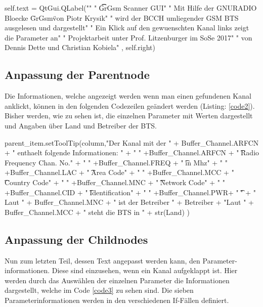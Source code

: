\begin{code}[firstnumber=100,numbers=left,stepnumber=1, caption={Titelseite},captionpos=b,label={code1}]
self.text = QtGui.QLabel("\n"
                         " \t\t   GrGsm Scanner GUI\n\n\n"
                         " Mit Hilfe der GNURADIO Bloecke \"GrGsm\" von Piotr Krysik\n"
                         " wird der BCCH umliegender GSM BTS ausgelesen und dargestellt\n\n"
                         " Ein Klick auf den gewuenschten Kanal links zeigt die Parameter an\n\n\n\n\n\n\n\n\n\n\n"
                         " Projektarbeit unter Prof. Litzenburger im SoSe 2017\n"
                         " von Dennis Dette und Christian Kobiela\n\n"
                         , self.right)
\end{code} 
\noindent 

\subsection*{Anpassung der Parentnode}

Die Informationen, welche angezeigt werden wenn man einen gefundenen Kanal anklickt, können in den folgenden Codezeilen geändert werden (Listing: \ref{code2}). Bisher werden, wie zu sehen ist, die einzelnen Parameter mit Werten dargestellt und Angaben über Land und Betreiber der BTS. 

\begin{code}[firstnumber=187,numbers=left,stepnumber=1, caption={Kanalinformation},captionpos=b,label={code2}]
parent_item.setToolTip(column,"Der Kanal mit der " + Buffer_Channel.ARFCN + 
		" enthaelt folgende Informationen: \n\n"
		+ " " +Buffer_Channel.ARFCN + " \t\tAbsolute Radio Frequency Chan. No.\n"
		+ " " +Buffer_Channel.FREQ + " \t\tFrequency in Mhz\n"
		+ " " +Buffer_Channel.LAC + " \t\tLocation Area Code\n"
		+ " " +Buffer_Channel.MCC + " \t\tMobile Country Code\n" 
		+ " " +Buffer_Channel.MNC + " \t\tMobile Network Code\n"
		+ " " +Buffer_Channel.CID + " \t\tCell Identification\n"			                        
		+ " " +Buffer_Channel.PWR+ " \t\tPower\n\n\n"
		+ " Laut " + Buffer_Channel.MNC + " ist der Betreiber " + Betreiber
		+ "\n Laut " + Buffer_Channel.MCC + " steht die BTS in " + str(Land)
		)
\end{code}

\subsection*{Anpassung der  Childnodes}

Nun zum letzten Teil, dessen Text angepasst werden kann, den Parameter-informationen. Diese sind einzusehen, wenn ein Kanal aufgeklappt ist. Hier werden durch das Auswählen der einzelnen Parameter die Informationen dargestellt, welche im Code \ref{code3} zu sehen sind. Die sieben Parameterinformationen werden in den verschiedenen If-Fällen definiert. 

